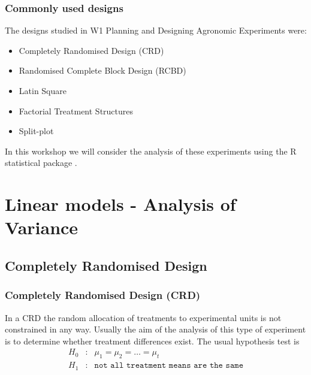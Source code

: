 \begin{frame}\frametitle{Commonly used designs}
The designs studied in W1 Planning and Designing Agronomic Experiments were:

\begin{itemize}
\item Completely Randomised Design (CRD)
\item Randomised Complete Block Design (RCBD)
\item Latin Square
\item Factorial Treatment Structures
\item Split-plot
\end{itemize}

In this workshop we will consider the analysis of these experiments using the R statistical package \cite{r}.

\end{frame}


\section{Linear models - Analysis of Variance}
\subsection{Completely Randomised Design}
\begin{frame}\frametitle{Completely Randomised Design (CRD)}
In a CRD the random allocation of treatments to experimental units is not constrained in any way. Usually the aim of
the analysis of this type of experiment is to determine whether treatment differences exist. The usual hypothesis test
is
\begin{eqnarray*}
	H_0&:& \mu_1 = \mu_2 = \hdots = \mu_t \\
	H_1&:& \texttt{not all treatment means are the same}
\end{eqnarray*}

\end{frame}



